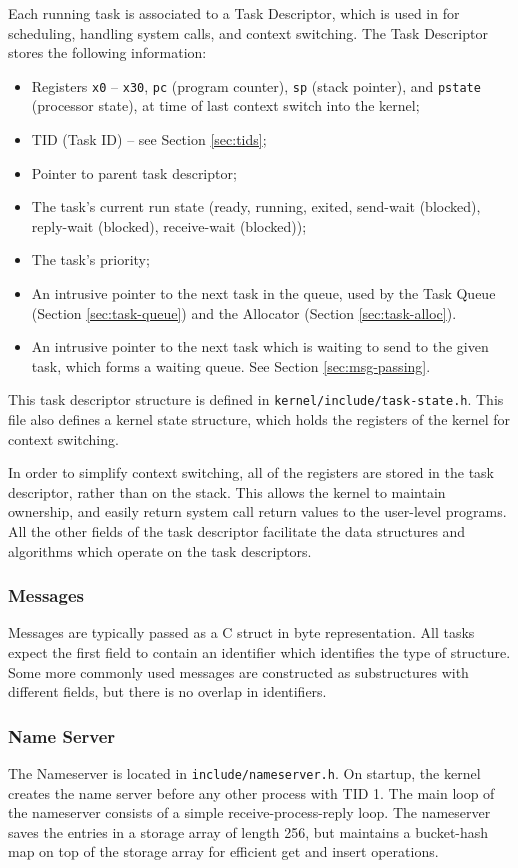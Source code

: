 \documentclass[12pt, titlepage]{article}
\begin{document}
    Each running task is associated to a Task Descriptor, which is used in for scheduling, handling system calls, and context switching. The Task Descriptor stores the following information:
    \begin{itemize}
        \item Registers \verb`x0` -- \verb`x30`, \verb`pc` (program counter), \verb`sp` (stack pointer), and \verb`pstate` (processor state), at time of last context switch into the kernel;
        \item TID (Task ID) -- see Section \ref{sec:tids};
        \item Pointer to parent task descriptor;
        \item The task's current run state (ready, running, exited, send-wait (blocked), reply-wait (blocked), receive-wait (blocked));
        \item The task's priority;
        \item An intrusive pointer to the next task in the queue, used by the Task Queue (Section \ref{sec:task-queue}) and the Allocator (Section \ref{sec:task-alloc}).
        \item An intrusive pointer to the next task which is waiting to send to the given task, which forms a waiting queue. See Section \ref{sec:msg-passing}.
    \end{itemize}
    This task descriptor structure is defined in \verb`kernel/include/task-state.h`. This file also defines a kernel state structure, which holds the registers of the kernel for context switching.

    In order to simplify context switching, all of the registers are stored in the task descriptor, rather than on the stack. This allows the kernel to maintain ownership, and easily return system call return values to the user-level programs. All the other fields of the task descriptor facilitate the data structures and algorithms which operate on the task descriptors.

    \subsubsection{Messages}
    Messages are typically passed as a C struct in byte representation. All tasks expect the first field to contain an identifier which identifies the type of structure. Some more commonly used messages are constructed as substructures with different fields, but there is no overlap in identifiers.

    \subsubsection{Name Server}
    The Nameserver is located in \verb`include/nameserver.h`.
    On startup, the kernel creates the name server before any other process with TID 1.
    The main loop of the nameserver consists of a simple receive-process-reply loop.
    The nameserver saves the entries in a storage array of length 256, but maintains a bucket-hash map on top
    of the storage array for efficient get and insert operations.
\end{document}
